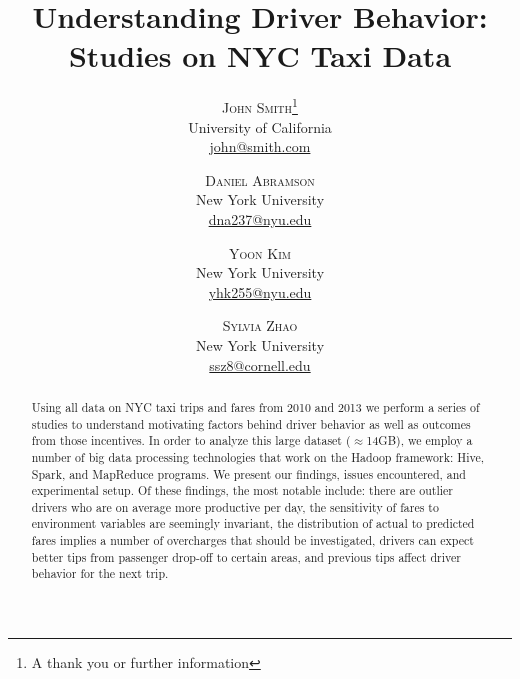 \documentclass[twoside]{article}
\title{\vspace{-15mm}\fontsize{24pt}{10pt}\selectfont\textbf{Understanding Driver Behavior: Studies on NYC Taxi Data}} %
\author{
\large
\textsc{John Smith}\thanks{A thank you or further information}\\[2mm] %
\normalsize University of California \\ %
\normalsize \href{mailto:john@smith.com}{john@smith.com} %
\vspace{-5mm}
}
\author{
\large
\textsc{Daniel Abramson}\\[2mm] %
\normalsize New York University \\ %
\normalsize \href{mailto:dna237@nyu.edu}{dna237@nyu.edu} %
\vspace{-5mm}
\and
\textsc{Yoon Kim}\\[2mm] %
\normalsize New York University \\ %
\normalsize \href{mailto:yhk255@nyu.edu}{yhk255@nyu.edu} %
\vspace{-5mm}
\and
\textsc{Sylvia Zhao}\\[2mm] %
\normalsize New York University \\ %
\normalsize \href{mailto:ssz8@cornell.edu}{ssz8@cornell.edu} %
\vspace{-5mm}
}
\date{}
\begin{document}
\maketitle %

\thispagestyle{fancy} %


\begin{abstract}

\noindent Using all data on NYC taxi trips and fares from 2010 and 2013 we perform a series of studies to understand motivating factors behind driver behavior as well as outcomes from those incentives. In order to analyze this large dataset ($\approx$14GB), we employ a number of big data processing technologies that work on the Hadoop framework: Hive, Spark, and MapReduce programs.  We present our findings, issues encountered, and experimental setup. Of these findings, the most notable include: there are outlier drivers who are on average more productive per day, the sensitivity of fares to environment variables are seemingly invariant, the distribution of actual to predicted fares implies a number of overcharges that should be investigated, drivers can expect better tips from passenger drop-off to certain areas, and previous tips affect driver behavior for the next trip. 

\end{abstract}

\end{document}
